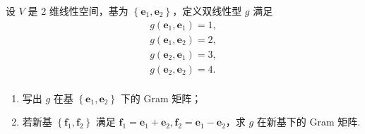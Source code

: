 设 $V$ 是 2 维线性空间，基为 $\left\{\boldsymbol{e}_1, \boldsymbol{e}_2\right\}$，定义双线性型 $g$ 满足
\[
\begin{aligned}
g \left(\boldsymbol{e}_1, \boldsymbol{e}_1\right) = 1, \\
g \left(\boldsymbol{e}_1, \boldsymbol{e}_2\right) = 2, \\
g \left(\boldsymbol{e}_2, \boldsymbol{e}_1\right) = 3, \\
g \left(\boldsymbol{e}_2, \boldsymbol{e}_2\right) = 4. \\
\end{aligned}
\]
\begin{enumerate}
    \item 写出 $g$ 在基 $\left\{\boldsymbol{e}_1, \boldsymbol{e}_2\right\}$ 下的 Gram 矩阵；
    \item 若新基 $\left\{\boldsymbol{f}_1, \boldsymbol{f}_2\right\}$ 满足 $\boldsymbol{f}_1 = \boldsymbol{e}_1 + \boldsymbol{e}_2, \boldsymbol{f}_2 = \boldsymbol{e}_1 - \boldsymbol{e}_2$，求 $g$ 在新基下的 Gram 矩阵.
\end{enumerate}

